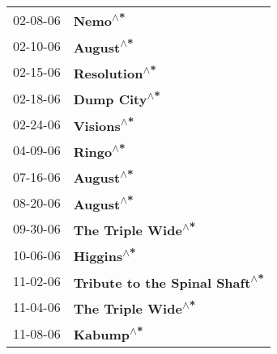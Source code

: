 \begin{supertabular}{p{0.25\columnwidth}p{0.75\columnwidth}}
 02-08-06 &                         \textbf{Nemo\textsuperscript{$\wedge$*}} \\
 02-10-06 &                       \textbf{August\textsuperscript{$\wedge$*}} \\
 02-15-06 &                   \textbf{Resolution\textsuperscript{$\wedge$*}} \\
 02-18-06 &                    \textbf{Dump City\textsuperscript{$\wedge$*}} \\
 02-24-06 &                      \textbf{Visions\textsuperscript{$\wedge$*}} \\
 04-09-06 &                        \textbf{Ringo\textsuperscript{$\wedge$*}} \\
 07-16-06 &                       \textbf{August\textsuperscript{$\wedge$*}} \\
 08-20-06 &                       \textbf{August\textsuperscript{$\wedge$*}} \\
 09-30-06 &              \textbf{The Triple Wide\textsuperscript{$\wedge$*}} \\
 10-06-06 &                      \textbf{Higgins\textsuperscript{$\wedge$*}} \\
 11-02-06 &  \textbf{Tribute to the Spinal Shaft\textsuperscript{$\wedge$*}} \\
 11-04-06 &              \textbf{The Triple Wide\textsuperscript{$\wedge$*}} \\
 11-08-06 &                       \textbf{Kabump\textsuperscript{$\wedge$*}} \\
\end{supertabular}
